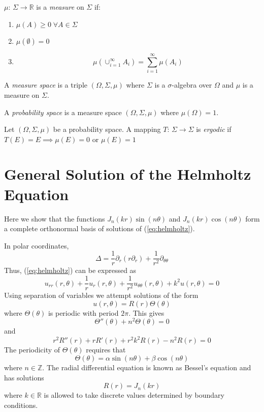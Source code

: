 \documentclass{report}
\begin{document}
\begin{dfn}[Measure]
$\mu$: $\Sigma \rightarrow \mathbb{R}$ is a \emph{measure} on $\Sigma$ if:
\begin{enumerate}
\item
$\mu(A) \ge 0 \; \forall A \in \Sigma$
\item
$\mu(\emptyset) = 0$
\item
\[
\mu\left(\cup_{i=1}^{\infty} A_{i} \right) = \sum_{i=1}^{\infty} \mu(A_{i})
\]
\end{enumerate}
\end{dfn}

\begin{dfn}
A \emph{measure space} is a triple $(\Omega, \Sigma, \mu)$ where $\Sigma$ is a $\sigma$-algebra over $\Omega$ and $\mu$ is a measure on $\Sigma$.
\end{dfn}

\begin{dfn}
A \emph{probability space} is a measure space $(\Omega, \Sigma, \mu)$ where $\mu(\Omega) = 1$.
\end{dfn}

\begin{dfn}[Ergodicity]
Let $(\Omega, \Sigma, \mu)$ be a probability space. A mapping $T$: $\Sigma \rightarrow \Sigma$ is \emph{ergodic} if $T(E) = E \implies \mu(E) = 0$ or $\mu(E) = 1$
\end{dfn}
  

\chapter{General Solution of the Helmholtz Equation}
\label{sec:helmholtz_basis}
Here we show that the functions $J_{n}(k r) \sin(n \theta)$ and $J_{n}(k r) \cos(n \theta)$ form a complete orthonormal basis of solutions of (\ref{eq:helmholtz}).

In polar coordinates,
\[
\Delta = \frac{1}{r} \partial_{r} (r \partial_{r}) + \frac{1}{r^{2}} \partial_{\theta \theta}
\]
Thus, (\ref{eq:helmholtz}) can be expressed as
\[
u_{rr}(r, \theta) + \frac{1}{r} u_{r}(r, \theta) + \frac{1}{r^{2}} u_{\theta \theta}(r, \theta) + k^2 u(r, \theta) = 0
\]
Using separation of variables we attempt solutions of the form
\[
u(r, \theta) = R(r) \Theta(\theta)
\]
where $\Theta(\theta)$ is periodic with period $2 \pi$. This gives
\[
\Theta''(\theta) + n^{2} \Theta(\theta) = 0
\]
and
\[
r^{2} R''(r) + r R'(r) + r^{2} k^{2} R(r) - n^{2} R(r) = 0
\]
The periodicity of $\Theta(\theta)$ requires that
\[
\Theta(\theta) = \alpha \sin(n \theta) + \beta \cos(n \theta)
\]
where $n \in \mathbb{Z}$.
The radial differential equation is known as Bessel's equation and has solutions
\[
R(r) = J_{n}(k r)
\]
where $k \in \mathbb{R}$ is allowed to take discrete values determined by boundary conditions.
\end{document}
